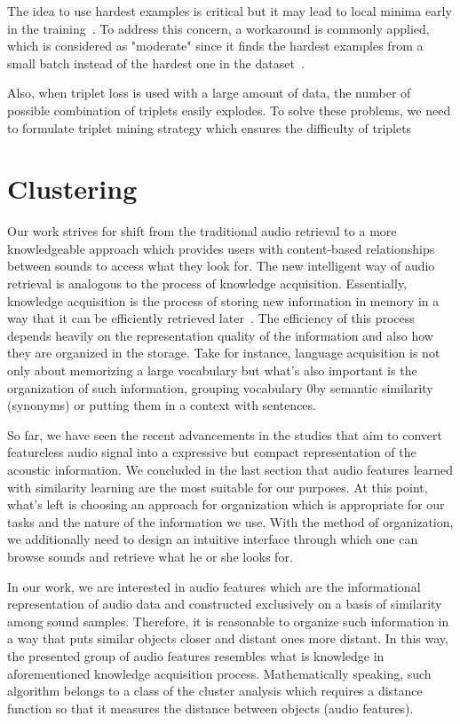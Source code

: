 The idea to use hardest examples is critical but it may lead to local minima early in the training~\cite{schroff2015}. To address this concern, a workaround is commonly applied, which is considered as "moderate" since it finds the hardest examples from a small batch instead of the hardest one in the dataset~\cite{hermans2017, yesiler2020}.

Also, when triplet loss is used with a large amount of data, the number of possible combination of triplets easily explodes. To solve these problems, we need to formulate triplet mining strategy which ensures the difficulty of triplets 

\section{Clustering}
Our work strives for shift from the traditional audio retrieval to a more knowledgeable approach which provides users with content-based relationships between sounds to access what they look for. The new intelligent way of audio retrieval is analogous to the process of knowledge acquisition. 
Essentially, knowledge acquisition is the process of storing new information in memory in a way that it can be efficiently retrieved later~\cite{danielle2002}. The efficiency of this process depends heavily on the representation quality of the information and also how they are organized in the storage. Take for instance, language acquisition is not only about memorizing a large vocabulary but what's also important is the organization of such information, grouping vocabulary 0by semantic similarity (synonyms) or putting them in a context with sentences.

So far, we have seen the recent advancements in the studies that aim to convert featureless audio signal into a expressive but compact representation of the acoustic information. We concluded in the last section that audio features learned with similarity learning are the most suitable for our purposes. At this point, what's left is choosing an approach for organization which is appropriate for our tasks and the nature of the information we use. With the method of organization, we additionally need to design an intuitive interface through which one can browse sounds and retrieve what he or she looks for.

In our work, we are interested in audio features which are the informational representation of audio data and constructed exclusively on a basis of similarity among sound samples. Therefore, it is reasonable to organize such information in a way that puts similar objects closer and distant ones more distant. In this way, the presented group of audio features resembles what is knowledge in aforementioned knowledge acquisition process. Mathematically speaking, such algorithm belongs to a class of the cluster analysis which requires a distance function so that it measures the distance between objects (audio features).

